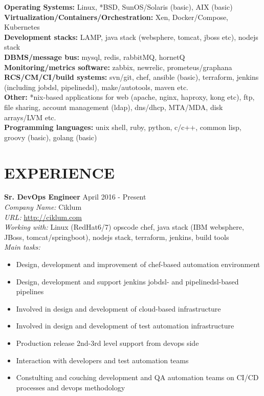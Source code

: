 \documentclass[mymargin,10pt]{res} %
\begin{document}
\begin{resume}
{\bf Operating Systems:} Linux, *BSD, SunOS/Solaris (basic), AIX (basic) \\
{\bf Virtualization/Containers/Orchestration:} Xen, Docker/Compose, Kubernetes \\
{\bf Development stacks:} LAMP, java stack (websphere, tomcat, jboss etc), nodejs stack \\
{\bf DBMS/message bus:} mysql, redis, rabbitMQ, hornetQ \\
{\bf Monitoring/metrics software:}  zabbix, newrelic, prometeus/graphana \\
{\bf RCS/CM/CI/build systems:} svn/git, chef, ansible (basic), terraform, jenkins (including jobdsl, pipelinedsl), make/autotools, maven etc. \\
{\bf Other:} *nix-based applications for web (apache, nginx, haproxy, kong etc), ftp, file sharing, account management (ldap), dns/dhcp, MTA/MDA, disk arrays/LVM etc. \\
{\bf Programming languages:} unix shell, ruby, python, c/c++, common lisp, groovy (basic), golang (basic) \\


\section{EXPERIENCE}

{\bf Sr. DevOps Engineer} \hfill April 2016 - Present \\
{\sl Company Name:} Ciklum \\
{\sl URL:} \url{http://ciklum.com} \\
{\sl Working with:} Linux (RedHat6/7) opscode chef, java stack (IBM websphere, JBoss, tomcat/springboot), nodejs stack, terraform, jenkins, build tools \\
{\sl Main tasks:}
\begin{itemize}
\item Design, development and improvement of chef-based automation environment
\item Design, development and support jenkins jobdsl- and pipelinedsl-based pipelines
\item Involved in design and development of cloud-based infrastructure
\item Involved in design and development of test automation infrastructure
\item Production release 2nd-3rd level support from devops side
\item Interaction with developers and test automation teams
\item Constulting and couching development and QA automation teams on CI/CD processes and devops methodology
\end{itemize}


\end{resume}
\end{document}
